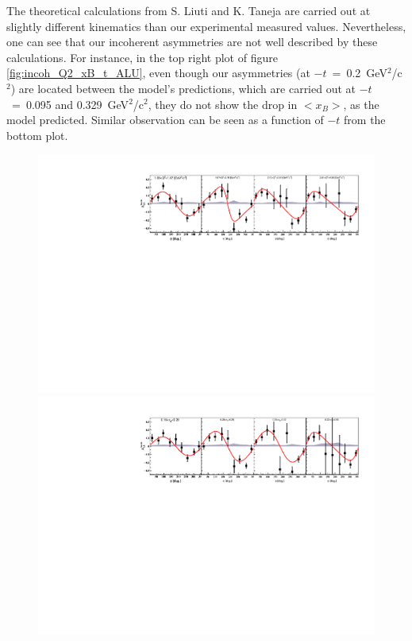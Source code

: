 The theoretical calculations from S. Liuti and K. Taneja are carried out at 
slightly different kinematics than our experimental measured values.  
Nevertheless, one can see that our incoherent asymmetries are not well 
described by these calculations. For instance, in the top right plot of figure 
\ref{fig:incoh_Q2_xB_t_ALU}, even though our asymmetries (at 
$-t$~=~0.2~GeV$^2$/c$^2$) are located between the model's predictions, which 
are carried out at $-t$~=~0.095 and 0.329~GeV$^2$/c$^2$, they do not show the 
drop in $<x_B>$, as the model predicted. Similar observation can be seen as a 
function of $-t$ from the bottom plot.

\begin{figure}[tpb]
\includegraphics[scale=0.9]{fig_Dec2016/ALU_phi_p_Q2.pdf}
\includegraphics[scale=0.9]{fig_Dec2016/ALU_phi_p_x.pdf}

\end{figure}
